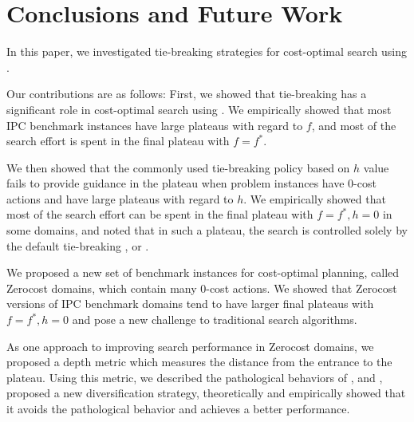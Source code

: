 
\section{Conclusions and Future Work}

In this paper, we investigated tie-breaking strategies for cost-optimal search using \astar.  
\begin{comment} %
We sought to (1) shed some light on the importance of tie-breaking in \astar,  %
(2) improve \astar without modifying its main heuristic function at all, and (3) to
improve \astar by introducing inadmissible techniques. We reached all of these goals successfully: We sought
various possible enhancements and achieved significant performance improvements solely by the tie-breaking
techniques. In detail, the contributions in this paper are the following:
\end{comment}
Our contributions are as follows:
 First, we showed that tie-breaking has a significant role in cost-optimal
       search using \astar. We empirically showed that most  IPC
       benchmark instances have large plateaus with regard to $f$, and most of the
       search effort is spent in the final plateau with $f=f^*$.

 We then showed that  the commonly used tie-breaking policy based on $h$ value fails to
       provide guidance in the plateau when problem instances have 0-cost
       actions and have large plateaus with regard to $h$.
       We empirically showed that most of the search effort can be spent in
       the final plateau with $f=f^*, h=0$ in some domains, and noted that in such
       a plateau, the search is controlled solely by the
       default tie-breaking \fifo, \lifo or \ro.

 We proposed  a new set of benchmark instances for cost-optimal planning, called Zerocost
 domains, which contain many 0-cost actions.
         We showed that Zerocost versions of IPC benchmark domains tend to have larger final plateaus with $f=f^*, h=0$ and pose a new challenge to traditional search algorithms.  %

 As one approach to improving search performance in Zerocost domains, we proposed a depth metric
       which measures the distance from the entrance to the
       plateau. Using this metric, we described the pathological
       behaviors of \fifo, \lifo and \ro, proposed a new diversification
       strategy, theoretically and empirically showed that it avoids the
       pathological behavior and achieves a better performance.

